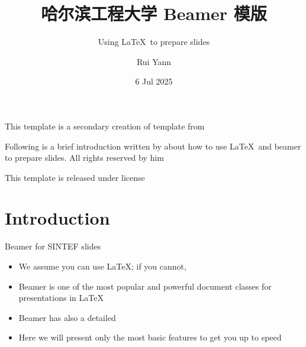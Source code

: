 \documentclass{beamer}
\title{哈尔滨工程大学 Beamer 模版}
\subtitle{Using \LaTeX\ to prepare slides}
\author{Rui Yann}
\date{6 Jul 2025}
\begin{document}
    
    \maketitle
    
    \begin{frame}
        This template is a secondary creation of  template from  \vspace{\baselineskip}
        
        Following is a brief introduction written by  about how to use \LaTeX\ and beamer to prepare slides. All rights reserved by him\vspace{\baselineskip}
        
        This template is released under  license
    \end{frame}
    
    \section{Introduction}
    
    \begin{frame}{Beamer for SINTEF slides}
        \begin{itemize}
            \item We assume you can use \LaTeX; if you cannot, 
            \item Beamer is one of the most popular and powerful document classes for presentations in \LaTeX
            \item Beamer has also a detailed 
            \item Here we will present only the most basic features to get you up to speed
        \end{itemize}
    \end{frame}
    
\end{document}
